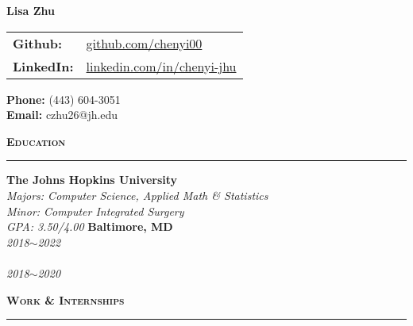 \documentclass[10pt, letterpaper]{article}
\begin{document}
\begin{paracol}{3}
	\raggedright
	{\LARGE \textbf{Lisa Zhu}}
	\switchcolumn
	\begin{center}
	\begin{tabular}{l l}
		\textbf{Github:} & \href{https://github.com/chenyi00}{github.com/chenyi00}\\
		\textbf{LinkedIn:} & \href{https://www.linkedin.com/in/chenyi-jhu/}{linkedin.com/in/chenyi-jhu}\\
	\end{tabular}
	\end{center}
	\switchcolumn
	\iffalse
	\begin{center}
	\begin{tabular}{r}
		(443) 604-3051\\
		czhu26@jhu.edu\\
	\end{tabular}
	\end{center}
	\fi
	\raggedleft
	\textbf{Phone:} (443) 604-3051\\%
	\textbf{Email:} czhu26@jh.edu\\
\end{paracol}

{\large \textbf{\textsc{Education}}}
\vspace{5pt}
\hrule
{}
\begin{paracol}{2}
	\textbf{The Johns Hopkins University}\\
	\textit{Majors: Computer Science, Applied Math \& Statistics}\\
	\textit{Minor: Computer Integrated Surgery}\\
	\textit{GPA: 3.50/4.00}
	\switchcolumn
	\raggedleft\textbf{Baltimore, MD}\\
	\raggedleft\textit{2018$\sim$2022}\\~\\
	\raggedleft\textit{2018$\sim$2020}\\
\end{paracol}
\vspace{3mm}

{\large \textbf{\textsc{Work \& Internships}}}
\vspace{5pt}
\hrule
\end{document}
